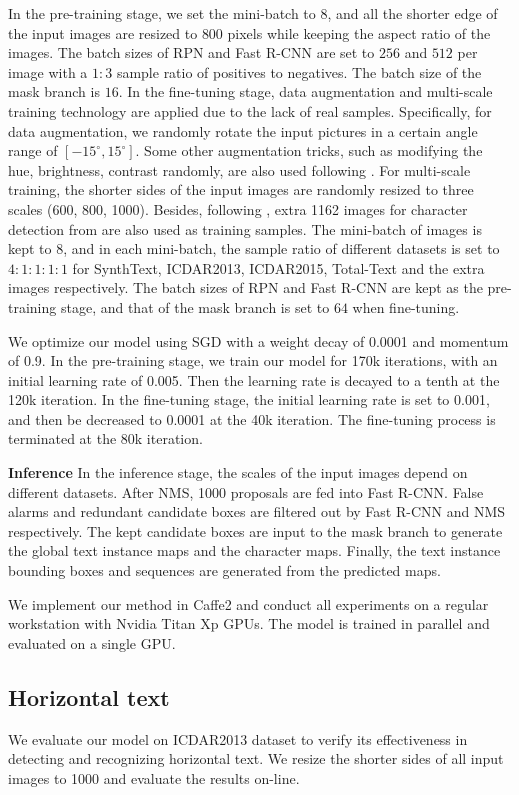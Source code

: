 \documentclass[runningheads]{llncs}
\begin{document}
In the pre-training stage, we set the mini-batch to $8$, and all the shorter edge of the input images are resized to $800$ pixels while keeping the aspect ratio of the images. The batch sizes of RPN and Fast R-CNN are set to $256$ and $512$ per image with a $1:3$ sample ratio of positives to negatives. The batch size of the mask branch is $16$. In the fine-tuning stage, data augmentation and multi-scale training technology are applied due to the lack of real samples. Specifically, for data augmentation, we randomly rotate the input pictures in a certain angle range of $[-15^\circ, 15^\circ]$. Some other augmentation tricks, such as modifying the hue, brightness, contrast randomly, are also used following \cite{liu2016ssd}. For multi-scale training, the shorter sides of the input images are randomly resized to three scales (600, 800, 1000). Besides, following \cite{Li_2017_ICCV}, extra 1162 images for character detection from \cite{zhong2016deeptext} are also used as training samples. The mini-batch of images is kept to 8, and in each mini-batch, the sample ratio of different datasets is set to $4:1:1:1:1$ for SynthText, ICDAR2013, ICDAR2015, Total-Text and the extra images respectively. The batch sizes of RPN and Fast R-CNN are kept as the pre-training stage, and that of the mask branch is set to $64$ when fine-tuning.

We optimize our model using SGD with a weight decay of 0.0001 and momentum of 0.9. In the pre-training stage, we train our model for 170k iterations, with an initial learning rate of 0.005. Then the learning rate is decayed to a tenth at the 120k iteration. In the fine-tuning stage, the initial learning rate is set to 0.001, and then be decreased to 0.0001 at the 40k iteration. The fine-tuning process is terminated at the 80k iteration.

\textbf{Inference} In the inference stage, the scales of the input images depend on different datasets. After NMS, 1000 proposals are fed into Fast R-CNN. False alarms and redundant candidate boxes are filtered out by Fast R-CNN and NMS respectively. The kept candidate boxes are input to the mask branch to generate the global text instance maps and the character maps. Finally, the text instance bounding boxes and sequences are generated from the predicted maps.

We implement our method in Caffe2 and conduct all experiments on a regular workstation with Nvidia Titan Xp GPUs. The model is trained in parallel and evaluated on a single GPU.

\subsection{Horizontal text}
We evaluate our model on ICDAR2013 dataset to verify its effectiveness in detecting and recognizing horizontal text. We resize the shorter sides of all input images to 1000 and evaluate the results on-line.
\end{document}
